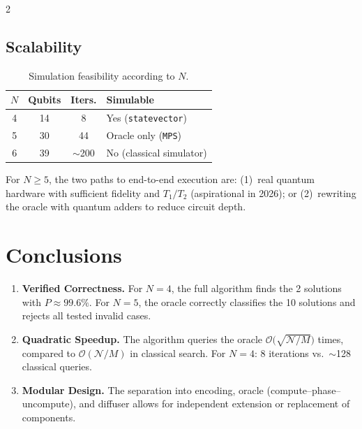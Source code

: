 \documentclass[9pt, a4paper]{extarticle}
\newcommand{\BigO}{\mathcal{O}}
\begin{document}
\begin{multicols}{2}
\subsection{Scalability}

\begin{table}[H]
    \centering
    \caption{Simulation feasibility according to $N$.}
    \label{tab:scale}
    \scriptsize
    \begin{tabular}{@{}cccl@{}}
        \toprule
        $N$ & Qubits & Iters. & Simulable \\
        \midrule
        4 & 14 & 8    & Yes (\texttt{statevector}) \\
        5 & 30 & 44   & Oracle only (\texttt{MPS}) \\
        6 & 39 & $\sim$200 & No (classical simulator) \\
        \bottomrule
    \end{tabular}
\end{table}

For $N \geq 5$, the two paths to end-to-end execution are:
(1)~real quantum hardware with sufficient fidelity and $T_1/T_2$
(aspirational in 2026); or (2)~rewriting the oracle with quantum adders to
reduce circuit depth.

\section{Conclusions}

\begin{enumerate}
    \item \textbf{Verified Correctness.}
          For $N\!=\!4$, the full algorithm finds the 2 solutions with $P \approx 99.6\%$.
          For $N\!=\!5$, the oracle correctly classifies the 10 solutions and rejects
          all tested invalid cases.

    \item \textbf{Quadratic Speedup.}
          The algorithm queries the oracle $\BigO\!\big(\sqrt{\mathcal{N}/M}\big)$ times,
          compared to $\BigO(\mathcal{N}/M)$ in classical search.
          For $N\!=\!4$: 8 iterations vs.\ $\sim$128 classical queries.

    \item \textbf{Modular Design.}
          The separation into encoding, oracle (compute--phase--uncompute), and
          diffuser allows for independent extension or replacement of components.


\end{enumerate}
\end{multicols}
\end{document}
